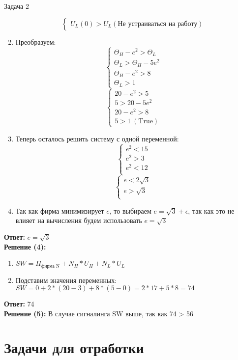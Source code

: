 \begin{mybox}{Задача 2}
\begin{enumerate}
$$\begin{cases}
        U_L(0)>U_L(\text{Не устраиваться на работу})
    \end{cases}$$
    \item Преобразуем: $$\begin{cases}
        \Theta_H-e^2>\Theta_L \\
        \Theta_L>\Theta_H-5e^2 \\
        \Theta_H-e^2>8 \\
        \Theta_L>1
    \end{cases}$$
    $$\begin{cases}
        20-e^2>5 \\
        5>20-5e^2 \\
        20-e^2>8 \\
        5>1 \ (\text{True})
    \end{cases}$$
    \item Теперь осталось решить систему с одной переменной: $$\begin{cases}
        e^2<15 \\
        e^2>3 \\
        e^2<12 \\
    \end{cases}$$
    $$\begin{cases}
        e<2\sqrt{3} \\
        e>\sqrt{3} \\
    \end{cases}$$
    \item Так как фирма минимизирует $e$, то выбираем $e=\sqrt{3}+\epsilon$, так как это не влияет на вычисления будем использовать $e=\sqrt{3}$
\end{enumerate}
\textbf{Ответ:} $e=\sqrt{3}$
\bigskip\\\textbf{Решение (4):}
\begin{enumerate}
    \item $SW=\Pi_{\text{фирма N}}+N_H*U_H+N_L*U_L$
    \item Подставим значения переменных: $SW=0+2*(20-3)+8*(5-0)=2*17+5*8=74$
\end{enumerate}
\textbf{Ответ:} 74
\bigskip\\\textbf{Решение (5):}
В случае сигналинга SW выше, так как 74 > 56

\end{mybox}

\section{Задачи для отработки}

